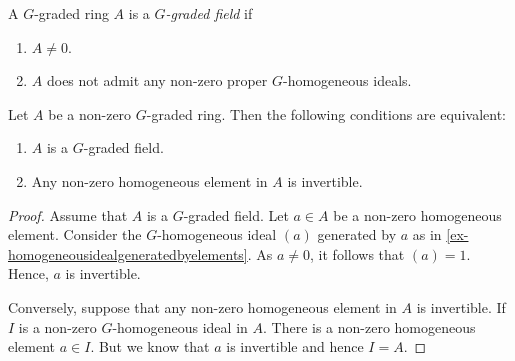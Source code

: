 \begin{definition}
    A $G$-graded ring $A$ is a \emph{$G$-graded field} if
    \begin{enumerate}
        \item $A\neq 0$.
        \item $A$ does not admit any non-zero proper $G$-homogeneous ideals.
    \end{enumerate} 
\end{definition}
\begin{proposition}\label{prop-gradedfieldchar}
    Let $A$ be a non-zero $G$-graded ring. Then the following conditions are equivalent:
    \begin{enumerate}
        \item $A$ is a $G$-graded field.
        \item Any non-zero homogeneous element in $A$ is invertible.
    \end{enumerate}
\end{proposition}
\begin{proof}
    Assume that $A$ is a $G$-graded field. Let $a\in A$ be a non-zero homogeneous element. Consider the $G$-homogeneous ideal $(a)$ generated by $a$ as in \cref{ex-homogeneousidealgeneratedbyelements}. As $a\neq 0$, it follows that $(a)=1$. Hence, $a$ is invertible.

    Conversely, suppose that any non-zero homogeneous element in $A$ is invertible. If $I$ is a non-zero $G$-homogeneous ideal in $A$. There is a non-zero homogeneous element $a\in I$. But we know that $a$ is invertible and hence $I=A$.
\end{proof}

